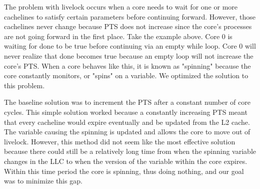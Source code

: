 \documentclass[12pt]{article}
\begin{document}
The problem with livelock occurs when a core needs to wait for one or more cachelines to satisfy certain parameters before continuing forward. However, those cachelines never change because PTS does not increase since the core’s processes are not going forward in the first place. Take  the example above. Core 0 is waiting for done to be true before continuing via an empty while loop. Core 0 will never realize that done becomes true because an empty loop will not increase the core’s PTS. When a core behaves like this, it is known as "spinning" because the core constantly monitors, or "spins" on a variable. We optimized the solution to this problem. 

	The baseline solution was to increment the PTS after a constant number of core cycles. This simple solution worked because a constantly increasing PTS meant that every cacheline would expire eventually and be updated from the L2 cache. The variable causing the spinning is updated and allows the core to move out of livelock. However, this method did not seem like the most effective solution because there could still be a relatively long time from when the spinning variable changes in the LLC to when the version of the variable within the core expires. Within this time period the core is spinning, thus doing nothing, and our goal was to minimize this gap. 
	
	
	
	

	
\end{document}
